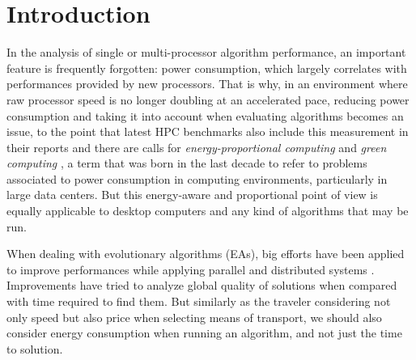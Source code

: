 \section{Introduction}


In the analysis of single or multi-processor algorithm performance, an
important feature 
is frequently forgotten:  power consumption, which largely correlates
with performances provided by new processors. That is why, in an
environment where raw processor speed is no longer doubling at an
accelerated pace, reducing power consumption and taking it into
account when evaluating algorithms becomes an issue, to the point that
latest HPC benchmarks also include this measurement in their reports
and there are calls for {\em energy-proportional computing}
\cite{energyaware} and 
\textit{green computing} \cite{green-computing}, a term that was born in the last decade to refer
to problems associated to power consumption in computing environments,
particularly in large data centers. But this
energy-aware and proportional point of view is equally applicable to desktop computers
and any kind of algorithms that may be run. 

When dealing with evolutionary algorithms (EAs), big efforts have been
applied to improve performances while applying parallel and
distributed systems \cite{paba}.  Improvements have tried to analyze
global quality of solutions when compared with time required to find
them.   
But similarly as the traveler considering not only speed but also
price when selecting means of transport, we should also consider
energy consumption when running an algorithm, and not just the time to
solution.  %

